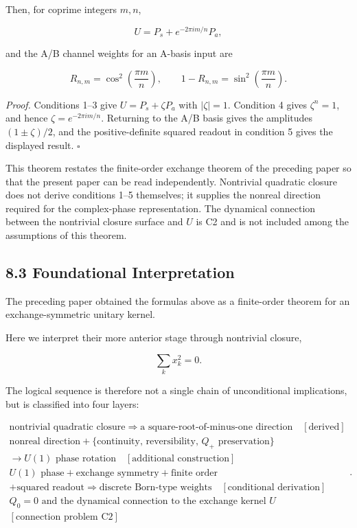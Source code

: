 \documentclass[
  a4paper,
  10pt]{article}
\begin{document}
Then, for coprime integers \(m,n\),

\[
U=P_s+e^{-2\pi im/n}P_a,
\]

and the A/B channel weights for an A-basis input are

\[
\boxed{
R_{n,m}=\cos^2\left(\frac{\pi m}{n}\right),
\qquad
1-R_{n,m}=\sin^2\left(\frac{\pi m}{n}\right)
}.
\]

\emph{Proof.} Conditions 1--3 give \(U=P_s+\zeta P_a\) with
\(|\zeta|=1\). Condition 4 gives \(\zeta^n=1\), and hence
\(\zeta=e^{-2\pi im/n}\). Returning to the A/B basis gives the
amplitudes \((1\pm\zeta)/2\), and the positive-definite squared readout
in condition 5 gives the displayed result. \(\square\)

This theorem restates the finite-order exchange theorem of the preceding
paper so that the present paper can be read independently. Nontrivial
quadratic closure does not derive conditions 1--5 themselves; it
supplies the nonreal direction required for the complex-phase
representation. The dynamical connection between the nontrivial closure
surface and \(U\) is C2 and is not included among the assumptions of
this theorem.

\subsection{8.3 Foundational
Interpretation}\label{83-foundational-interpretation}

The preceding paper obtained the formulas above as a finite-order
theorem for an exchange-symmetric unitary kernel.

Here we interpret their more anterior stage through nontrivial closure,

\[
\boxed{
\sum_kx_k^2=0
}.
\]

The logical sequence is therefore not a single chain of unconditional
implications, but is classified into four layers:

\[
\boxed{
\begin{gathered}
\text{nontrivial quadratic closure}
\Rightarrow\text{a square-root-of-minus-one direction}
\quad[\text{derived}]\\
\text{nonreal direction}
+\{\text{continuity, reversibility, }Q_+\text{ preservation}\}\\
\longrightarrow U(1)\text{ phase rotation}
\quad[\text{additional construction}]\\
U(1)\text{ phase}+\text{exchange symmetry}+\text{finite order}\\
+\text{squared readout}
\Rightarrow\text{discrete Born-type weights}
\quad[\text{conditional derivation}]\\
Q_0=0\text{ and the dynamical connection to the exchange kernel }U\\
[\text{connection problem C2}]
\end{gathered}
}.
\]
\end{document}

